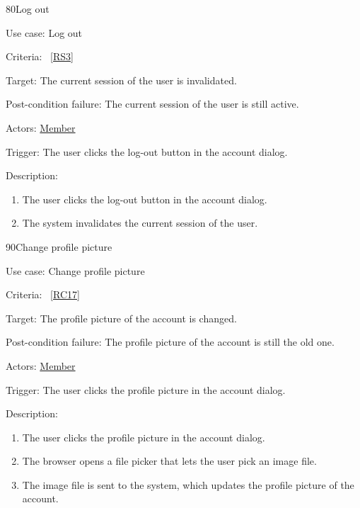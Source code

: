 \vspace{2.0em}

\begin{function}{80}{Log out}
	\item[Use case:] Log out
	\item[Criteria:]~\ref{RS3}
	\item[Target:] The current session of the user is invalidated.
	\item[Post-condition failure:] The current session of the user is still active.
	\item[Actors:] \hyperref[def:member]{Member}
	\item[Trigger:] The user clicks the log-out button in the account dialog.
	\item[Description:] ~
	\begin{enumerate}
		\item The user clicks the log-out button in the account dialog.
		\item The system invalidates the current session of the user.
	\end{enumerate}
\end{function}
\vspace{2.0em}

\begin{function}{90}{Change profile picture}
	\item[Use case:] Change profile picture
	\item[Criteria:]~\ref{RC17}
	\item[Target:] The profile picture of the account is changed.
	\item[Post-condition failure:] The profile picture of the account is still the old one.
	\item[Actors:] \hyperref[def:member]{Member}
	\item[Trigger:] The user clicks the profile picture in the account dialog.
	\item[Description:] ~
	\begin{enumerate}
		\item The user clicks the profile picture in the account dialog.
		\item The browser opens a file picker that lets the user pick an image file.
		\item The image file is sent to the system, which updates the profile picture of the account.
	\end{enumerate}
\end{function}
\vspace{2.0em}

